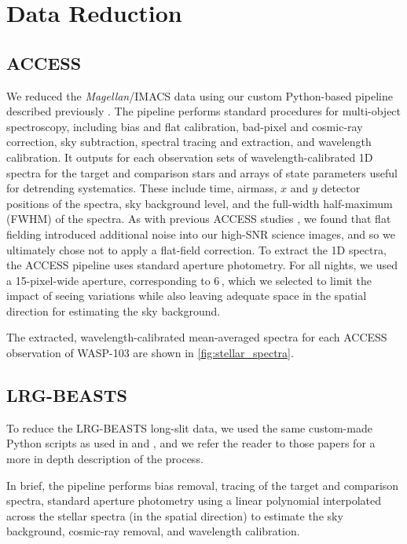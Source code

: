\documentclass[twocolumn]{aastex63}
\newcommand{\Magellan}{\textit{Magellan}}
\begin{document}
\section{Data Reduction}
\label{sec:data_reduction}

\subsection{ACCESS}
\label{sec:dr_ACCESS}

We reduced the \Magellan/IMACS data using our custom Python-based pipeline described previously \citep{Jordan2013, Rackham2017, Bixel2019, Espinoza2019, McGruder2020, Weaver2020, Weaver2021}.
The pipeline performs standard procedures for multi-object spectroscopy, including bias and flat calibration, bad-pixel and cosmic-ray correction, sky subtraction, spectral tracing and extraction, and wavelength calibration. It outputs for each observation sets of wavelength-calibrated 1D spectra for the target and comparison stars and arrays of state parameters useful for detrending systematics.
These include time, airmass, $x$ and $y$ detector positions of the spectra, sky background level, and the full-width half-maximum (FWHM) of the spectra.
As with previous ACCESS studies \citep{Rackham2017, Bixel2019, Espinoza2019, McGruder2020, Weaver2020,Weaver2021}, we found that flat fielding introduced additional noise into our high-SNR science images, and so we ultimately chose not to apply a flat-field correction. To extract the 1D spectra, the ACCESS pipeline uses standard aperture photometry. For all nights, we used a 15-pixel-wide aperture, corresponding to 6\,\arcsec, which we selected to limit the impact of seeing variations while also leaving adequate space in the spatial direction for estimating the sky background.

The extracted, wavelength-calibrated mean-averaged spectra for each ACCESS observation of WASP-103 are shown in \autoref{fig:stellar_spectra}.

\subsection{LRG-BEASTS}
\label{sec:dr_LRG-BEASTS}

To reduce the LRG-BEASTS long-slit data, we used the same custom-made Python scripts as used in \cite{Kirk2017,Kirk2018,Kirk2019} and \cite{Alderson2020}, and we refer the reader to those papers for a more in depth description of the process.

In brief, the pipeline performs bias removal, tracing of the target and comparison spectra, standard aperture photometry using a linear polynomial interpolated across the stellar spectra (in the spatial direction) to estimate the sky background, cosmic-ray removal, and wavelength calibration. 
\end{document}
